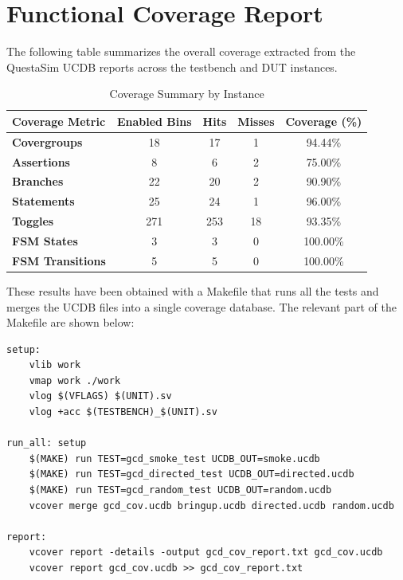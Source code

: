 \newpage
\section{Functional Coverage Report}

The following table summarizes the overall coverage extracted from the QuestaSim UCDB reports across the testbench and DUT instances.

\begin{table}[H]
    \centering
    \renewcommand{\arraystretch}{1.3}
    \begin{tabular}{|l|c|c|c|c|}
        \hline
        \textbf{Coverage Metric} & \textbf{Enabled Bins} & \textbf{Hits} & \textbf{Misses} & \textbf{Coverage (\%)} \\ \hline
        \textbf{Covergroups}     & 18                    & 17            & 1               & 94.44\%                \\ \hline
        \textbf{Assertions}      & 8                     & 6             & 2               & 75.00\%                \\ \hline
        \textbf{Branches}        & 22                    & 20            & 2               & 90.90\%                \\ \hline
        \textbf{Statements}      & 25                    & 24            & 1               & 96.00\%                \\ \hline
        \textbf{Toggles}         & 271                   & 253           & 18              & 93.35\%                \\ \hline
        \textbf{FSM States}      & 3                     & 3             & 0               & 100.00\%               \\ \hline
        \textbf{FSM Transitions} & 5                     & 5             & 0               & 100.00\%               \\ \hline
    \end{tabular}
    \caption{Coverage Summary by Instance}
    \label{tab:coverage_summary}
\end{table}

These results have been obtained with a Makefile that runs all the tests and merges the UCDB files into a single coverage database. The relevant part of the Makefile are shown below:

\begin{verbatim}
setup:
	vlib work
	vmap work ./work
	vlog $(VFLAGS) $(UNIT).sv
	vlog +acc $(TESTBENCH)_$(UNIT).sv

run_all: setup 
	$(MAKE) run TEST=gcd_smoke_test UCDB_OUT=smoke.ucdb
	$(MAKE) run TEST=gcd_directed_test UCDB_OUT=directed.ucdb
	$(MAKE) run TEST=gcd_random_test UCDB_OUT=random.ucdb
	vcover merge gcd_cov.ucdb bringup.ucdb directed.ucdb random.ucdb

report: 
	vcover report -details -output gcd_cov_report.txt gcd_cov.ucdb
	vcover report gcd_cov.ucdb >> gcd_cov_report.txt
\end{verbatim}

